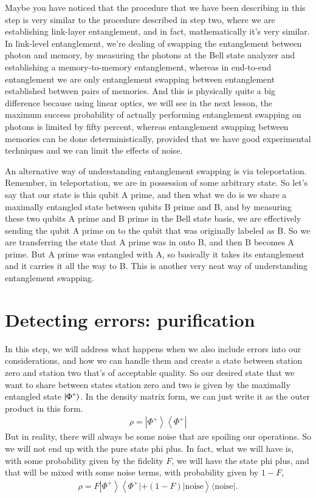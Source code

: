 Maybe you have noticed that the procedure that we have been describing in this step is very similar to the procedure described in step two, where we are establishing link-layer entanglement, and in fact, mathematically it's very similar. In link-level entanglement, we're dealing of swapping the entanglement between photon and memory, by measuring the photons at the Bell state analyzer and establishing a memory-to-memory entanglement, whereas in end-to-end entanglement we are only entanglement swapping between entanglement established between pairs of memories. And this is physically quite a big difference because using linear optics, we will see in the next lesson, the maximum success probability of actually performing entanglement swapping on photons is limited by fifty percent, whereas entanglement swapping between memories can be done deterministically, provided that we have good experimental techniques and we can limit the effects of noise.

An alternative way of understanding entanglement swapping is via teleportation. Remember, in teleportation, we are in possession of some arbitrary state. So let's say that our state is this qubit A prime, and then what we do is we share a maximally entangled state between qubits B prime and B, and by measuring these two qubits A prime and B prime in the Bell state basis, we are effectively sending the qubit A prime on to the qubit that was originally labeled as B. So we are transferring the state that A prime was in onto B, and then B becomes A prime. But A prime was entangled with A, so basically it takes its entanglement and it carries it all the way to B. This is another very neat way of understanding entanglement swapping.

\section{Detecting errors: purification}
\label{sec:purification}


In this step, we will address what happens when we also include errors into our considerations, and how we can handle them and create a state between station zero and station two that's of acceptable quality. So our desired state that we want to share between states station zero and two is given by the maximally entangled state $\ket{\Phi^+}$. In the density matrix form, we can just write it as the outer product in this form. 
\begin{align}
    \rho=\left|\Phi^{+}\right\rangle\left\langle\Phi^{+}\right|
\end{align}
But in reality, there will always be some noise that are spoiling our operations. So we will not end up with the pure state phi plus. In fact, what we will have is, with some probability given by the fidelity $F$, we will have the state phi plus, and that will be mixed with some noise terms, with probability given by $1-F$, 
\begin{align}
    \rho=F\left|\Phi^{+}\right\rangle\left\langle\Phi^{+}|+(1-F)| \text {noise}\right\rangle\langle\text {noise}|.
\end{align}

